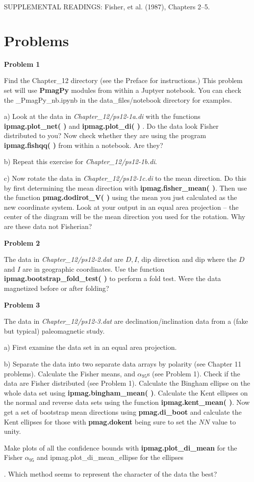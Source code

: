 \vskip 12pt
\noindent SUPPLEMENTAL READINGS: Fisher,  et al. (1987), Chapters 2--5.  \nocite{fisher87}

\vskip 12pt

\section{Problems}

{\parindent 0pt  \parskip 8pt

{\bf Problem 1 }

Find the  Chapter\_12 directory (see the Preface for instructions.)    This problem set will use  {\bf PmagPy} modules from within a Juptyer notebook.  You can check the \_PmagPy\_nb.ipynb in the data\_files/notebook directory  for examples. 
 
 a)
Look at the data in {\it Chapter\_12/ps12-1a.di} with the functions  {\bf ipmag.plot\_net( )} and {\bf ipmag.plot\_di(  )} .  Do the data look Fisher distributed to you?   
Now check whether they are using the program  {\bf ipmag.fishqq( )} from within a notebook.  Are they?   

b) Repeat this exercise for {\it Chapter\_12/ps12-1b.di}.  

c)  Now rotate the data in {\it Chapter\_12/ps12-1c.di}  to the mean direction.    Do this by first determining the mean  direction with {\bf ipmag.fisher\_mean( )}.     Then use the function  {\bf pmag.dodirot\_V( )}  using the mean you just calculated as the new coordinate system.  Look at your output in an equal area projection  -- the center of the diagram will be the mean direction you used for the rotation.   Why are these data not Fisherian?  

{\bf Problem 2} 

The data in {\it Chapter\_12/ps12-2.dat} are $D, I$, dip direction and dip where the $D$ and $I$ are in geographic coordinates.   Use the function  {\bf ipmag.bootstrap\_fold\_test( )} to perform a fold test.  Were the data magnetized before or after folding?   



{\bf Problem 3}

The data in {\it Chapter\_12/ps12-3.dat} are declination/inclination data from a (fake but typical) paleomagnetic study. 

a)  First examine the data set  
in an equal area projection.  

b) Separate the data into two separate data arrays by polarity (see Chapter 11 problems).   
Calculate the Fisher means, and $\alpha_{95}$s (see Problem 1).  Check if the data are Fisher distributed (see Problem 1).   Calculate the Bingham ellipse on the whole data set using {\bf ipmag.bingham\_mean( )}.  
Calculate the Kent ellipses on the normal and reverse data sets using the function {\bf ipmag.kent\_mean( )}.  Now get a set of   bootstrap mean directions using {\bf pmag.di\_boot} and calculate the Kent ellipses for those with {\bf pmag.dokent} being sure to set the $NN$ value to unity.   

 Make plots of all the confidence bounds with  {\bf ipmag.plot\_di\_mean} for the Fisher $\alpha_{95}$ and  {ipmag.plot\_di\_mean\_ellipse}  for the ellipses}.   Which method seems to represent the character of the data the best?   


